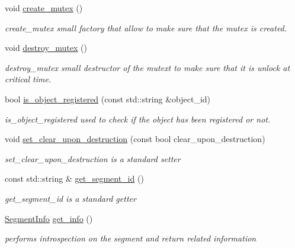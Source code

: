 \begin{DoxyCompactItemize}
\mbox{\label{classshared__memory_1_1SharedMemorySegment_ac8bbbc98968a8a2b3fe35c50e0768d8f}} 
void \hyperlink{classshared__memory_1_1SharedMemorySegment_ac8bbbc98968a8a2b3fe35c50e0768d8f}{create\+\_\+mutex} ()
\begin{DoxyCompactList}\small\item\em create\+\_\+mutex small factory that allow to make sure that the mutex is created. \end{DoxyCompactList}\item 
\mbox{\label{classshared__memory_1_1SharedMemorySegment_a64d69c4965cd448040bc20e4f9009abc}} 
void \hyperlink{classshared__memory_1_1SharedMemorySegment_a64d69c4965cd448040bc20e4f9009abc}{destroy\+\_\+mutex} ()
\begin{DoxyCompactList}\small\item\em destroy\+\_\+mutex small destructor of the mutext to make sure that it is unlock at critical time. \end{DoxyCompactList}\item 
bool \hyperlink{classshared__memory_1_1SharedMemorySegment_ae7a86bba2f8158917b48c0bd3a7bdf9b}{is\+\_\+object\+\_\+registered} (const std\+::string \&object\+\_\+id)
\begin{DoxyCompactList}\small\item\em is\+\_\+object\+\_\+registered used to check if the object has been registered or not. \end{DoxyCompactList}\item 
void \hyperlink{classshared__memory_1_1SharedMemorySegment_ae2eb51704f44076db6ce79054e9d2572}{set\+\_\+clear\+\_\+upon\+\_\+destruction} (const bool clear\+\_\+upon\+\_\+destruction)
\begin{DoxyCompactList}\small\item\em set\+\_\+clear\+\_\+upon\+\_\+destruction is a standard setter \end{DoxyCompactList}\item 
const std\+::string \& \hyperlink{classshared__memory_1_1SharedMemorySegment_ab7f1f01a94d4e45ed907be9bcdb71a24}{get\+\_\+segment\+\_\+id} ()
\begin{DoxyCompactList}\small\item\em get\+\_\+segment\+\_\+id is a standard getter \end{DoxyCompactList}\item 
\mbox{\label{classshared__memory_1_1SharedMemorySegment_aa742cf04463a94a51239b96de2da6947}} 
\hyperlink{classshared__memory_1_1SegmentInfo}{Segment\+Info} \hyperlink{classshared__memory_1_1SharedMemorySegment_aa742cf04463a94a51239b96de2da6947}{get\+\_\+info} ()
\begin{DoxyCompactList}\small\item\em performs introspection on the segment and return related information \end{DoxyCompactList}\end{DoxyCompactItemize}
